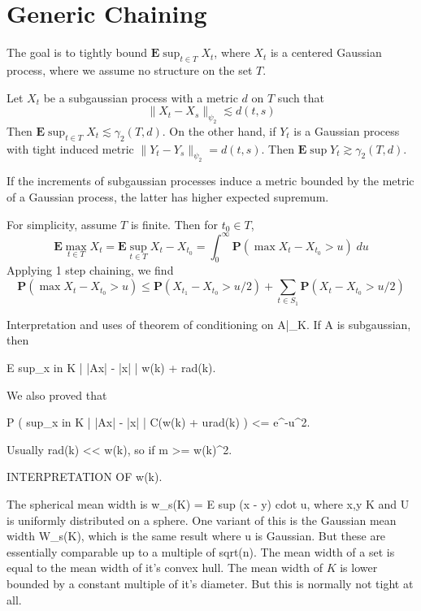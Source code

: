 \chapter{Generic Chaining}

The goal is to tightly bound $\mathbf{E} \sup_{t \in T} X_t$, where $X_t$ is a centered Gaussian process, where we assume no structure on the set $T$.

\begin{theorem}
    Let $X_t$ be a subgaussian process with a metric $d$ on $T$ such that
    \[ \| X_t - X_s \|_{\psi_2} \lesssim d(t,s) \]
    Then $\mathbf{E} \sup_{t \in T} X_t \lesssim \gamma_2(T,d)$. On the other hand, if $Y_t$ is a Gaussian process with tight induced metric $\| Y_t - Y_s \|_{\psi_2} = d(t,s)$. Then $\mathbf{E} \sup Y_t \gtrsim \gamma_2(T,d)$.
\end{theorem}

If the increments of subgaussian processes induce a metric bounded by the metric of a Gaussian process, the latter has higher expected supremum.

For simplicity, assume $T$ is finite. Then for $t_0 \in T$,
%
\[ \mathbf{E} \max_{t \in T} X_t = \mathbf{E} \sup_{t \in T} X_t - X_{t_0} = \int_0^\infty \mathbf{P}(\max X_t - X_{t_0} > u)\; du \]
%
Applying 1 step chaining, we find
%
\[ \mathbf{P}(\max X_t - X_{t_0} > u) \leq \mathbf{P}(X_{t_1} - X_{t_0} > u/2) + \sum_{t \in S_1} \mathbf{P}(X_t - X_{t_0} > u/2) \]











Interpretation and uses of theorem of conditioning on A|_K. If A is subgaussian, then

E sup_{x in K} | |Ax| -  |x| | \lesssim w(k) + rad(k).

We also proved that

P ( sup_{x in K} | |Ax| -  |x| | \geq C(w(k) + urad(k) ) <= e^{-u^2}.

Usually rad(k) << w(k), so if m >= w(k)^2.

INTERPRETATION OF w(k).

The spherical mean width is w_s(K) = E sup (x - y) cdot u, where x,y \in K and U is uniformly distributed on a sphere. One variant of this is the Gaussian mean width W_s(K), which is the same result where u is Gaussian. But these are essentially comparable up to a multiple of sqrt(n). The mean width of a set is equal to the mean width of it's convex hull. The mean width of $K$ is lower bounded by a constant multiple of it's diameter. But this is normally not tight at all.

